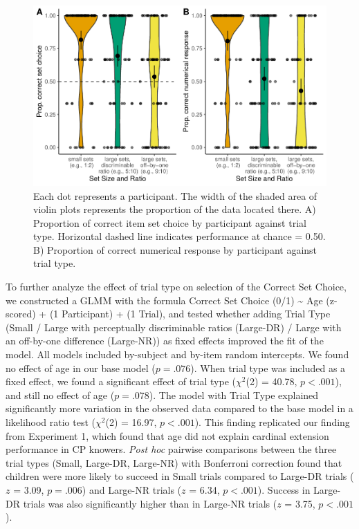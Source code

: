 \documentclass[
  man,floatsintext]{apa7}
\begin{document}
\begin{figure}
\centering
\includegraphics{2_writeup_files/figure-latex/exp2-plot-1.pdf}
\caption{\label{fig:exp2-plot}Each dot represents a participant. The width of the shaded area of violin plots represents the proportion of the data located there. A) Proportion of correct item set choice by participant against trial type. Horizontal dashed line indicates performance at chance = 0.50. B) Proportion of correct numerical response by participant against trial type.}
\end{figure}

To further analyze the effect of trial type on selection of the Correct Set Choice, we constructed a GLMM with the formula Correct Set Choice (0/1) \textasciitilde{} Age (z-scored) + (1 \textbar{} Participant) + (1 \textbar{} Trial), and tested whether adding Trial Type (Small / Large with perceptually discriminable ratios (Large-DR) / Large with an off-by-one difference (Large-NR)) as fixed effects improved the fit of the model. All models included by-subject and by-item random intercepts. We found no effect of age in our base model (\(p = .076\)). When trial type was included as a fixed effect, we found a significant effect of trial type (\(\chi^2\)(2) = 40.78, \(p < .001\)), and still no effect of age (\(p = .078\)). The model with Trial Type explained significantly more variation in the observed data compared to the base model in a likelihood ratio test (\(\chi^2\)(2) = 16.97, \(p < .001\)). This finding replicated our finding from Experiment 1, which found that age did not explain cardinal extension performance in CP knowers. \emph{Post hoc} pairwise comparisons between the three trial types (Small, Large-DR, Large-NR) with Bonferroni correction found that children were more likely to succeed in Small trials compared to Large-DR trials (\(z\) = 3.09, \(p = .006\)) and Large-NR trials (\(z\) = 6.34, \(p < .001\)). Success in Large-DR trials was also significantly higher than in Large-NR trials (\(z\) = 3.75, \(p < .001\)).
\end{document}
